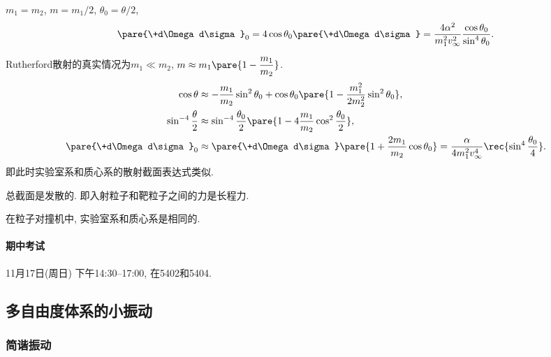\documentclass{ctexart}
\begin{document}
\begin{cenum}
    \item $m_1 = m_2$, $m = m_1/2$, $\theta_0 = \theta/2$,
    \[ \pare{\+d\Omega d\sigma}_0 = 4\cos\theta_0 \pare{\+d\Omega d\sigma} = \frac{4\alpha^2}{m_1^2v_\infty^2} \frac{\cos\theta_0}{\sin^4\theta_0}. \]
    \item Rutherford散射的真实情况为$m_1 \ll m_2$, $\displaystyle m \approx m_1 \pare{1-\frac{m_1}{m_2}}$.
    \begin{align*}
        \cos\theta &\approx -\frac{m_1}{m_2}\sin^2\theta_0 + \cos\theta_0 \pare{1-\frac{m_1^2}{2m_2^2}\sin^2\theta_0}, \\
        \sin^{-4}\frac{\theta}{2} &\approx \sin^{-4} \frac{\theta_0}{2}\pare{1-4\frac{m_1}{m_2}\cos^2 \frac{\theta_0}{2}}, \\
        \pare{\+d\Omega d\sigma}_0 &\approx \pare{\+d\Omega d\sigma}\pare{1+\frac{2m_1}{m_2}\cos\theta_0} = \frac{\alpha}{4m_1^2 v_\infty^4}\rec{\sin^4 \frac{\theta_0}{4}}.
    \end{align*}
    即此时实验室系和质心系的散射截面表达式类似.
\end{cenum}
\begin{remark}
    总截面是发散的. 即入射粒子和靶粒子之间的力是长程力.
\end{remark}
\begin{remark}
    在粒子对撞机中, 实验室系和质心系是相同的.
\end{remark}

\paragraph{期中考试} %
\label{par:期中考试}

11月17日(周日) 下午14:30--17:00, 在5402和5404.




\subsection{多自由度体系的小振动} %
\label{sub:多自由度体系的小振动}

\subsubsection{简谐振动} %
\label{ssub:简谐振动}
\end{document}
